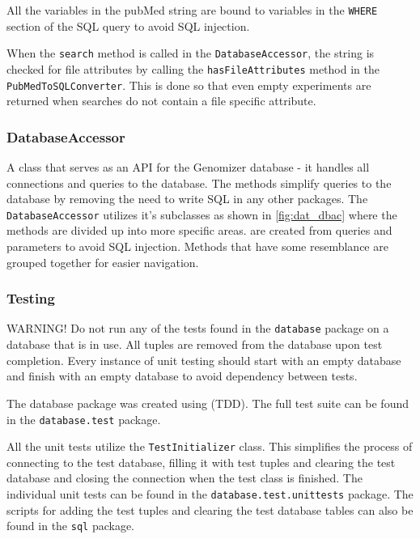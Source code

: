 All the variables in the pubMed string are bound to variables in the \texttt{WHERE} section of the SQL query to avoid SQL injection. 

When the \texttt{search} method is called in the \texttt{DatabaseAccessor}, the  string is checked for file attributes by calling the \texttt{hasFileAttributes} method in the \texttt{PubMedToSQLConverter}. This is done so that even empty experiments are returned when searches do not contain a file specific attribute.

\subsubsection{DatabaseAccessor}
A class that serves as an API for the Genomizer database - it handles all connections and queries to the database. The methods simplify queries to the database by removing the need to write SQL in any other packages. The \texttt{DatabaseAccessor} utilizes it's subclasses as shown in \ref{fig:dat_dbac} where the methods are divided up into more specific areas.  are created from queries and parameters to avoid SQL injection. Methods that have some resemblance are grouped together for easier navigation.

\subsubsection{Testing}
WARNING! Do not run any of the tests found in the \texttt{database} package on a database that is in use. All tuples are removed from the database upon test completion. Every instance of unit testing should start with an empty database and finish with an empty database to avoid dependency between tests.

The database package was created using  (TDD). The full test suite can be found in the \texttt{database.test} package.

All the unit tests utilize the \texttt{TestInitializer} class. This simplifies the process of connecting to the test database, filling it with test tuples and clearing the test database and closing the connection when the test class is finished. 
The individual unit tests can be found in the \texttt{database.test.unittests} package. The scripts for adding the test tuples and clearing the test database tables can also be found in the \texttt{sql} package.